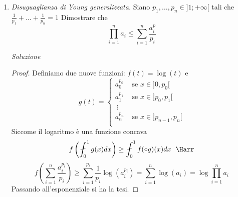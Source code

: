 \documentclass{article}
\newcommand{\se}{\text{ se }}
\begin{document}
\begin{enumerate}[label=\textbf{Esercizio 12.\arabic*.},itemindent=*]
\item \textit{Disuguaglianza di Young generalizzata.} Siano $p_1, \dots, p_n \in ]1;+\infty[$ tali che $\frac{1}{p_1}+\dots+\frac{1}{p_n}=1$ Dimostrare che 
\[\prod_{i=1}^na_i\leq \sum_{i=1}^n\frac{a_i^p}{p_i}\]

\item[\textit{\large Soluzione~}]~

\begin{proof}
    Definiamo due nuove funzioni: $f(t)=\log(t)$ e 
    \[g(t)=\begin{cases}
        a_0^{p_0} &\se x \in ]0, p_0[\\
        a_1^{p_1} &\se x \in ]p_0, p_1[\\
        \:\vdots\\
        a_n^{p_n} &\se x \in ]p_{n-1}, p_n[\\
    \end{cases}\]
    Siccome il logaritmo è una funzione concava
    \[f\left( \fint_0^1 g(x)dx\right)\geq\fint_0^1f(\circ g)(x)dx~~\Harr\]
    \[f\left( \sum_{i=1}^n\frac{a_i^{p_i}}{p_i} \right)\geq \sum_{i=1}^{p_i}\frac{1}{p_i}\log(a_i^{p_i})=\sum_{i=1}^n\log(a_i)=\log{\prod_{i=1}^n}a_i\]
    Passando all'esponenziale si ha la tesi.
\end{proof}
\end{enumerate}
\end{document}
